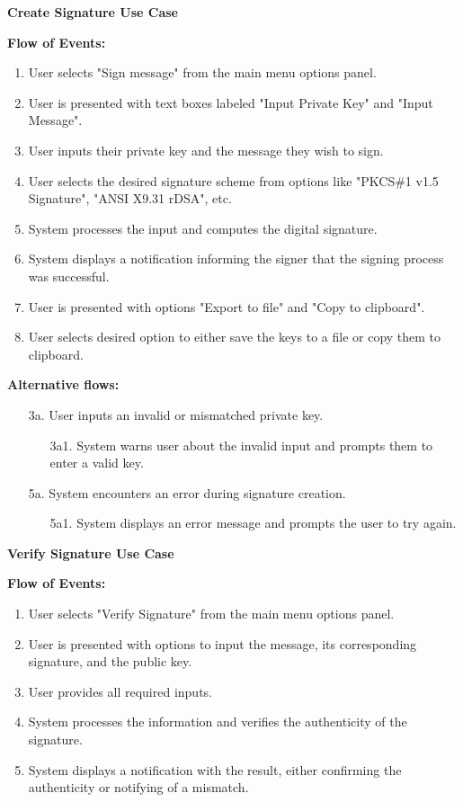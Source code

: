 \documentclass[]{final_report}
\theoremstyle{definition}
\begin{document}
\textbf{Create Signature Use Case}

\noindent\textbf{Flow of Events:}
\begin{enumerate}
    \item User selects "Sign message" from the main menu options panel.
    \item User is presented with text boxes labeled "Input Private Key" and "Input Message".
    \item User inputs their private key and the message they wish to sign.
    \item User selects the desired signature scheme from options like "PKCS\#1 v1.5 Signature", "ANSI X9.31 rDSA", etc.
    \item System processes the input and computes the digital signature.
    \item System displays a notification informing the signer that the signing process was successful.
    \item User is presented with options "Export to file" and "Copy to clipboard".
    \item User selects desired option to either save the keys to a file or copy them to clipboard.
\end{enumerate}

\noindent\textbf{Alternative flows:}
\begin{enumerate}
    \item[3a.] User inputs an invalid or mismatched private key.
    \begin{enumerate}
        \item[3a1.] System warns user about the invalid input and prompts them to enter a valid key.
    \end{enumerate}
    \item[5a.] System encounters an error during signature creation.
    \begin{enumerate}
        \item[5a1.] System displays an error message and prompts the user to try again.
    \end{enumerate}
\end{enumerate}

\textbf{Verify Signature Use Case}

\noindent\textbf{Flow of Events:}
\begin{enumerate}
    \item User selects "Verify Signature" from the main menu options panel.
    \item User is presented with options to input the message, its corresponding signature, and the public key.
    \item User provides all required inputs.
    \item System processes the information and verifies the authenticity of the signature.
    \item System displays a notification with the result, either confirming the authenticity or notifying of a mismatch.
\end{enumerate}
\end{document}
